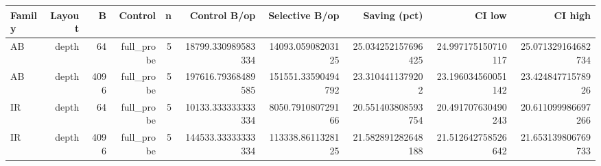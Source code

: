 \begin{tabular}{lrrrrrrrrr}
\toprule
Family & Layout & B & Control & n & Control B/op & Selective B/op & Saving (pct) & CI low & CI high \\
\midrule
AB & depth & 64 & full\_probe & 5 & 18799.330989583334 & 14093.05908203125 & 25.034252157696425 & 24.997175150710117 & 25.071329164682734 \\
AB & depth & 4096 & full\_probe & 5 & 197616.79368489585 & 151551.33590494792 & 23.3104411379202 & 23.196034560051142 & 23.42484771578926 \\
IR & depth & 64 & full\_probe & 5 & 10133.333333333334 & 8050.791080729166 & 20.551403808593754 & 20.491707630490243 & 20.611099986697266 \\
IR & depth & 4096 & full\_probe & 5 & 144533.33333333334 & 113338.8611328125 & 21.582891282648188 & 21.512642758526642 & 21.653139806769733 \\
\bottomrule
\end{tabular}
